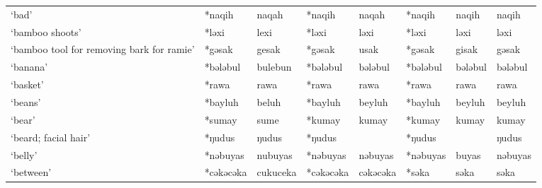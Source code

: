 \begin{landscape}
\begin{longtable}[c]{@{}p{3cm}<{\raggedright}p{2.75cm}<{\raggedright}p{2.75cm}<{\raggedright}p{2.75cm}<{\raggedright}p{2.75cm}<{\raggedright}p{2.75cm}<{\raggedright}p{2.75cm}<{\raggedright}p{2.75cm}<{\raggedright}@{}}
`bad'                                                & *naqih       & naqah                         & *naqih         & naqah                      & *naqih           & naqih                    & naqih                             \\
`bamboo shoots'                                      & *ləxi        & lexi                          & *ləxi          & ləxi                       & *ləxi            & ləxi                     & ləxi                              \\
`bamboo tool for removing bark for ramie'            & *gəsak       & gesak                         & *gəsak         & usak                       & *gəsak           & gisak                    & gəsak                             \\
`banana'                                             & *bələbul     & bulebun                       & *bələbul       & bələbul                    & *bələbul         & bələbul                  & bələbul                           \\
`basket'                                             & *rawa        & rawa                          & *rawa          & rawa                       & *rawa            & rawa                     & rawa                              \\
`beans'                                              & *bayluh      & beluh                         & *bayluh        & beyluh                     & *bayluh          & beyluh                   & beyluh                            \\
`bear'                                               & *sumay       & sume                          & *kumay         & kumay                      & *kumay           & kumay                    & kumay                             \\
`beard; facial hair'                                 & *ŋudus       & ŋudus                         & *ŋudus         &                            & *ŋudus           &                          & ŋudus                             \\
`belly'                                              & *nəbuyas     & nubuyas                       & *nəbuyas       & nəbuyas                    & *nəbuyas         & buyas                    & nəbuyas                           \\
`between'                                            & *cəkəcəka    & cukuceka                      & *cəkəcəka      & cəkəcəka                   & *səka            & səka                     & səka                              \\

\end{longtable}
\end{landscape}
